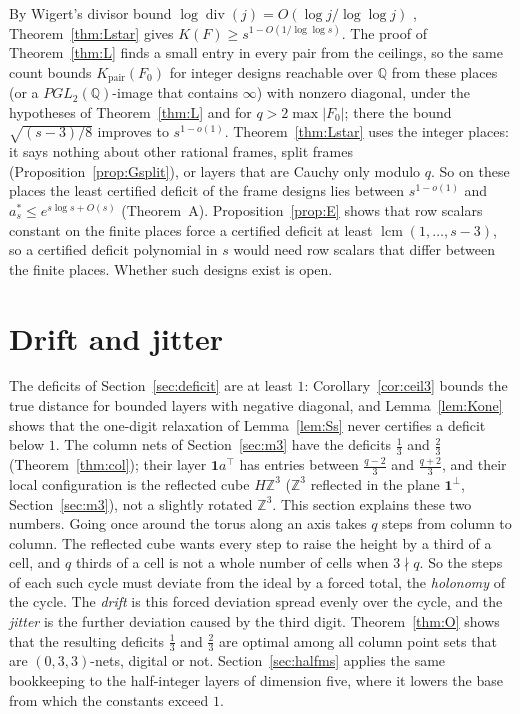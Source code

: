 \documentclass[11pt]{amsart}
\theoremstyle{definition}
\theoremstyle{plain}
\newcommand{\Z}{\mathbb{Z}}
\begin{document}
By Wigert's divisor bound $\log\operatorname{div}(j)=O(\log j/\log\log j)$ \cite[Thm.~317]{HW08}, Theorem~\ref{thm:Lstar} gives $K(F)\ge s^{1-O(1/\log\log s)}$. The proof of Theorem~\ref{thm:L} finds a small entry in every pair from the ceilings, so the same count bounds $K_{\mathrm{pair}}(F_0)$ for integer designs reachable over $\mathbb Q$ from these places (or a $PGL_2(\mathbb Q)$-image that contains $\infty$) with nonzero diagonal, under the hypotheses of Theorem~\ref{thm:L} and for $q>2\max|F_0|$; there the bound $\sqrt{(s-3)/8}$ improves to $s^{1-o(1)}$. Theorem~\ref{thm:Lstar} uses the integer places: it says nothing about other rational frames, split frames (Proposition~\ref{prop:Gsplit}), or layers that are Cauchy only modulo $q$. So on these places the least certified deficit of the frame designs lies between $s^{1-o(1)}$ and $a^*_s\le e^{s\log s+O(s)}$ (Theorem~A). Proposition~\ref{prop:E} shows that row scalars constant on the finite places force a certified deficit at least $\operatorname{lcm}(1,\dots,s-3)$, so a certified deficit polynomial in $s$ would need row scalars that differ between the finite places. Whether such designs exist is open.


\section{Drift and jitter}\label{sec:drift}
The deficits of Section~\ref{sec:deficit} are at least $1$: Corollary~\ref{cor:ceil3} bounds the true distance for bounded layers with negative diagonal, and Lemma~\ref{lem:Kone} shows that the one-digit relaxation of Lemma~\ref{lem:Ss} never certifies a deficit below $1$. The column nets of Section~\ref{sec:m3} have the deficits $\frac13$ and $\frac23$ (Theorem~\ref{thm:col}); their layer $\mathbf 1a^{\!\top}$ has entries between $\frac{q-2}3$ and $\frac{q+2}3$, and their local configuration is the reflected cube $H\Z^3$ ($\Z^3$ reflected in the plane $\mathbf 1^\perp$, Section~\ref{sec:m3}), not a slightly rotated $\Z^3$. This section explains these two numbers. Going once around the torus along an axis takes $q$ steps from column to column. The reflected cube wants every step to raise the height by a third of a cell, and $q$ thirds of a cell is not a whole number of cells when $3\nmid q$. So the steps of each such cycle must deviate from the ideal by a forced total, the \emph{holonomy} of the cycle. The \emph{drift} is this forced deviation spread evenly over the cycle, and the \emph{jitter} is the further deviation caused by the third digit. Theorem~\ref{thm:O} shows that the resulting deficits $\frac13$ and $\frac23$ are optimal among all column point sets that are $(0,3,3)$-nets, digital or not. Section~\ref{sec:halfms} applies the same bookkeeping to the half-integer layers of dimension five, where it lowers the base from which the constants exceed $1$.
\end{document}
